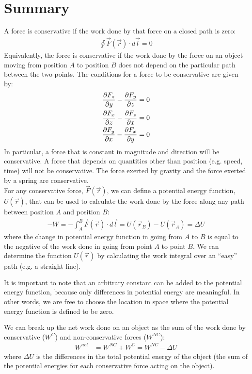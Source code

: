 \newpage
\section{Summary}
\begin{chapterSummary}
A force is conservative if the work done by that force on a closed path is zero:
\begin{align*}
\oint \vec F(\vec r) \cdot d\vec l = 0
\end{align*}
Equivalently, the force is conservative if the work done by the force on an object moving from position $A$ to position $B$ does not depend on the particular path between the two points. The conditions for a force to be conservative are given by:
\begin{align*}
\frac{\partial F_z}{\partial y}-\frac{\partial F_y}{\partial z} &= 0 \nonumber\\
\frac{\partial F_x}{\partial z}-\frac{\partial F_z}{\partial x} &= 0\nonumber\\
\frac{\partial F_y}{\partial x}-\frac{\partial F_x}{\partial y} &= 0
\end{align*}
In particular, a force that is constant in magnitude and direction will be conservative. A force that depends on quantities other than position (e.g. speed, time) will not be conservative. The force exerted by gravity and the force exerted by a spring are conservative.\\

For any conservative force, $\vec F(\vec r)$, we can define a potential energy function, $U(\vec r)$, that can be used to calculate the work done by the force along any path between position $A$ and position $B$:
\begin{align*}
-W = - \int_A^B \vec F(\vec r) \cdot d\vec l = U(\vec r_B) - U(\vec r_A) = \Delta U
\end{align*}
where the change in potential energy function in going from $A$ to $B$ is equal to the negative of the work done in going from point $A$ to point $B$. We can determine the function $U(\vec r)$ by calculating the work integral over an ``easy'' path (e.g. a straight line).

It is important to note that an arbitrary constant can be added to the potential energy function, because only differences in potential energy are meaningful. In other words, we are free to choose the location in space where the potential energy function is defined to be zero.

We can break up the net work done on an object as the sum of the work done by conservative ($W^C$) and non-conservative forces ($W^{NC}$):
\begin{align*}
W^{net}&=W^{NC}+W^{C}=W^{NC}-\Delta U
\end{align*}
where $\Delta U$ is the differences in the total potential energy of the object (the sum of the potential energies for each conservative force acting on the object).


\end{chapterSummary}
